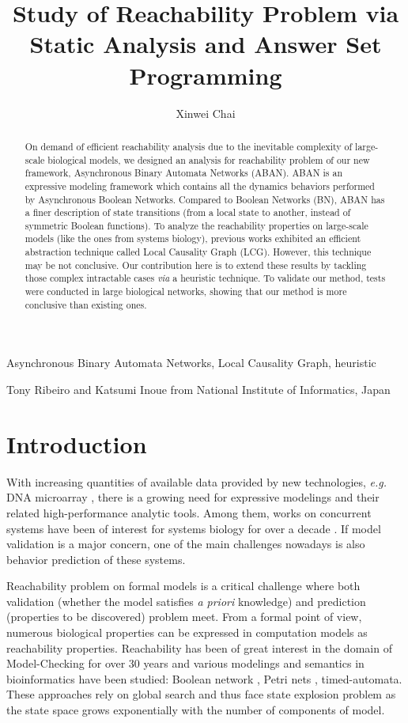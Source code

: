 \documentclass[en]{jdoc}
\title{Study of Reachability Problem via Static Analysis and Answer Set Programming}
\author{Xinwei Chai}
\begin{document}
\makehead

\begin{abstract}
On demand of efficient reachability analysis due to the inevitable complexity of large-scale biological models, we designed an analysis for reachability problem of our new framework, Asynchronous Binary Automata Networks (ABAN). ABAN is an expressive modeling framework which contains all the dynamics behaviors performed by Asynchronous Boolean Networks. Compared to Boolean Networks (BN), ABAN has a finer description of state transitions (from a local state to another, instead of symmetric Boolean functions). To analyze the reachability properties on large-scale models (like the ones from systems biology), previous works exhibited an efficient abstraction technique called Local Causality Graph (LCG). However, this technique may be not conclusive. Our contribution here is to extend these results by tackling those complex intractable cases \textit{via} a heuristic technique. To validate our method, tests were conducted in large biological networks, showing that our method is more conclusive than existing ones.
\end{abstract}

\begin{keywords}
Asynchronous Binary Automata Networks, Local Causality Graph, heuristic
\end{keywords}

\begin{collaborations}
Tony Ribeiro and Katsumi Inoue from National Institute of Informatics, Japan
\end{collaborations}

\section{Introduction}
With increasing quantities of available data provided by new technologies, \textit{e.g.} DNA microarray \cite{marx2013}, there is a growing need for expressive modelings and their related high-performance analytic tools. Among them, works on concurrent systems have been of interest for systems biology for over a decade \cite{bortolussi2008modeling,wiley2003computational}. If model validation is a major concern, one of the main challenges nowadays is also behavior prediction of these systems. 

Reachability problem on formal models is a critical challenge where both validation (whether the model satisfies \textit{a priori} knowledge) and prediction (properties to be discovered) problem meet. From a formal point of view, numerous biological properties can be expressed in computation models as reachability properties. 
Reachability has been of great interest in the domain of Model-Checking for over 30 years \cite{clarke20142} and various modelings and semantics in bioinformatics have been studied: Boolean network \cite{akutsu2007control}, Petri nets \cite{mayr1984,esparza1998}, timed-automata\cite{Daws1998,wozna2003}. These approaches rely on global search and thus face state explosion problem as the state space grows exponentially with the number of components of model.
\end{document}
